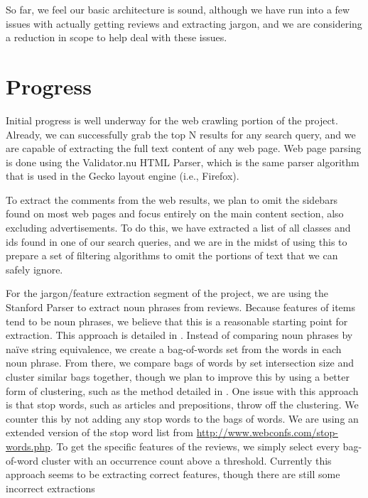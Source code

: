 \documentclass{article}
\begin{document}
So far, we feel our basic architecture is sound, although we have run into a
few issues with actually getting reviews and extracting jargon, and we are
considering a reduction in scope to help deal with these issues.

\section{Progress}
Initial progress is well underway for the web crawling portion of the project.  
Already, we can successfully grab the top N results for any search query, and
we are capable of extracting the full text content of any web page.  Web page
parsing is done using the Validator.nu HTML Parser, which is the same parser
algorithm that is used in the Gecko layout engine (i.e., Firefox).

To extract the comments from the web results, we plan to omit the sidebars
found on most web pages and focus entirely on the main content section, also
excluding advertisements.  To do this, we have extracted a list of all classes
and ids found in one of our search queries, and we are in the midst of using
this to prepare a set of filtering algorithms to omit the portions of text that
we can safely ignore.

For the jargon/feature extraction segment of the project, we are using the 
Stanford Parser to extract noun phrases from reviews.  Because features of 
items tend to be noun phrases, we believe that this is a reasonable starting 
point for extraction.  This approach is detailed in \cite{opine}.  Instead of 
comparing noun phrases by na\" ive string equivalence, we create a bag-of-words 
set from the words in each noun phrase.  From there, we compare bags of words 
by set intersection size and cluster similar bags together, though we plan to 
improve this by using a better form of clustering, such as the method detailed 
in \cite{lexrank}.  One issue with this approach is that stop words, such as 
articles and prepositions, throw off the clustering.  We counter this by not 
adding any stop words to the bags of words.  We are using an extended version 
of the stop word list from \url{http://www.webconfs.com/stop-words.php}.  To 
get the specific features of the reviews, we simply select every bag-of-word 
cluster with an occurrence count above a threshold.  Currently this approach 
seems to be extracting correct features, though there are still some incorrect 
extractions 
\end{document}

